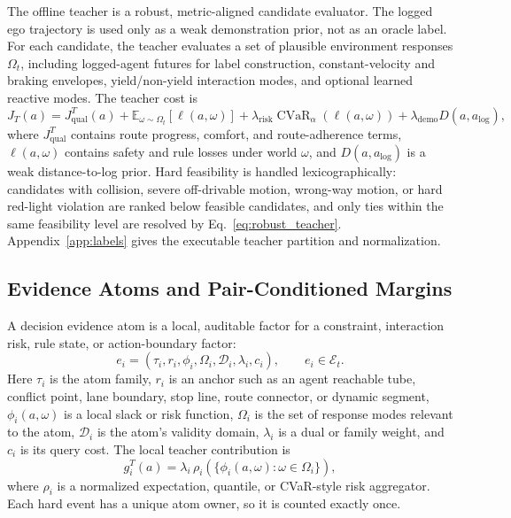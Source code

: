 \documentclass{article}
\newcommand{\E}{\mathcal{E}}
\begin{document}
The offline teacher is a robust, metric-aligned candidate evaluator. The logged ego trajectory is used only as a weak demonstration prior, not as an oracle label. For each candidate, the teacher evaluates a set of plausible environment responses $\Omega_t$, including logged-agent futures for label construction, constant-velocity and braking envelopes, yield/non-yield interaction modes, and optional learned reactive modes. The teacher cost is
\begin{equation}
    J_T(a)=J_{\mathrm{qual}}^T(a)
    +\mathbb E_{\omega\sim\Omega_t}\!\left[\ell(a,\omega)\right]
    +\lambda_{\mathrm{risk}}\operatorname{CVaR}_{\alpha}\!\left(\ell(a,\omega)\right)
    +\lambda_{\mathrm{demo}}D(a,a_{\mathrm{log}}),
    \label{eq:robust_teacher}
\end{equation}
where $J_{\mathrm{qual}}^T$ contains route progress, comfort, and route-adherence terms, $\ell(a,\omega)$ contains safety and rule losses under world $\omega$, and $D(a,a_{\mathrm{log}})$ is a weak distance-to-log prior. Hard feasibility is handled lexicographically: candidates with collision, severe off-drivable motion, wrong-way motion, or hard red-light violation are ranked below feasible candidates, and only ties within the same feasibility level are resolved by Eq.~\eqref{eq:robust_teacher}. Appendix~\ref{app:labels} gives the executable teacher partition and normalization.

\subsection{Evidence Atoms and Pair-Conditioned Margins}
\label{sec:evidence_atoms}

A decision evidence atom is a local, auditable factor for a constraint, interaction risk, rule state, or action-boundary factor:
\begin{equation}
    e_i=(\tau_i,r_i,\phi_i,\Omega_i,\mathcal D_i,\lambda_i,c_i), \qquad e_i\in\E_t.
    \label{eq:atom_def}
\end{equation}
Here $\tau_i$ is the atom family, $r_i$ is an anchor such as an agent reachable tube, conflict point, lane boundary, stop line, route connector, or dynamic segment, $\phi_i(a,\omega)$ is a local slack or risk function, $\Omega_i$ is the set of response modes relevant to the atom, $\mathcal D_i$ is the atom's validity domain, $\lambda_i$ is a dual or family weight, and $c_i$ is its query cost. The local teacher contribution is
\begin{equation}
    g_i^T(a)=\lambda_i\,\rho_i\!\left(\{\phi_i(a,\omega):\omega\in\Omega_i\}\right),
    \label{eq:local_atom_cost}
\end{equation}
where $\rho_i$ is a normalized expectation, quantile, or CVaR-style risk aggregator. Each hard event has a unique atom owner, so it is counted exactly once.
\end{document}
